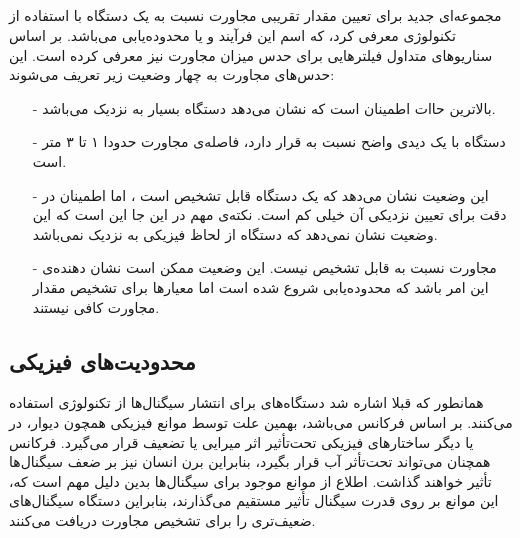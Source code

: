 \documentclass[oneside]{report}
\begin{document}
 \subsection{{\normalsize {}}}
  {\normalsize {}}
  مجموعه‌ای جدید برای تعیین مقدار تقریبی مجاورت نسبت به یک دستگاه با استفاده از تکنولوژی 
   {\normalsize {}}
   معرفی کرد، که اسم این فرآیند 
    {\normalsize {}}
    و یا محدوده‌یابی می‌باشد. 
    بر اساس سناریو‌های متداول 
     {\normalsize {}}
     فیلترهایی برای حدس میزان مجاورت نیز معرفی کرده است. این حدس‌های مجاورت به چهار وضعیت زیر تعریف می‌شوند:‌
     \begin{itemize}
     	\item[-]  {\normalsize {}}
     	بالاترین حاات اطمینان است که نشان می‌دهد دستگاه بسیار به 
     	 {\normalsize {}}
     	 نزدیک می‌باشد.
     	\item[-]  {\normalsize {}}
   دستگاه با یک دیدی واضح نسبت به 
    {\normalsize {}}
    قرار دارد، فاصله‌ی مجاورت حدودا ۱ تا ۳ متر است.  
     	\item[-] {\normalsize {}}
     	این وضعیت نشان می‌دهد که یک دستگاه
     	 {\normalsize {}}
     	 قابل تشخیص است ، اما اطمینان در دقت برای تعیین نزدیکی آن خیلی کم است. نکته‌ی مهم در این جا این است که این وضعیت نشان نمی‌دهد که دستگاه از لحاظ فیزیکی به 
     	  {\normalsize {}}
     	  نزدیک نمی‌باشد.  
     	\item[-] {\normalsize {}}
     	مجاورت نسبت به 
     	 {\normalsize {}}
     	 قابل تشخیص نیست. این وضعیت ممکن است نشان دهنده‌ی این امر باشد که محدوده‌یابی شروع شده است اما معیارها برای تشخیص مقدار مجاورت کافی نیستند. 
     \end{itemize}
    
    \subsection{محدودیت‌های فیزیکی}
  همانطور که قبلا اشاره شد  دستگاه‌های 
         	  {\normalsize {}}
         	  برای انتشار سیگنال‌ها از تکنولوژی
         	       	  {\normalsize {}}
     استفاده می‌کنند. 
          	  {\normalsize {}}
     بر اساس فرکانس 
          	  {\normalsize {}}
          	   می‌باشد، بهمین علت توسط موانع فیزیکی همچون دیوار، در یا دیگر ساختار‌های فیزیکی تحت‌تأثیر اثر میرایی یا تضعیف قرار می‌گیرد. فرکانس 
          	        	  {\normalsize {}} 
  همچنان می‌تواند تحت‌تأثر آب قرار بگیرد، بنابراین برن انسان نیز بر ضعف سیگنال‌ها تأثیر خواهند گذاشت. 
  اطلاع از موانع موجود برای سیگنال‌‌ها بدین دلیل مهم است که، این موانع بر روی قدرت سیگنال تأثیر مستقیم می‌گذارند، بنابراین دستگاه 
       	  {\normalsize {}}
       	  سیگنال‌های ضعیف‌تری را برای تشخیص مجاورت دریافت می‌کنند.        	        	     	       	  
    
    \cite{ibeaconoverview}
	
	
	
	
	
	
	
	
	
	
	
	
	
	\newpage
	\def\bibname{مراجع}
	
	
\end{document}
